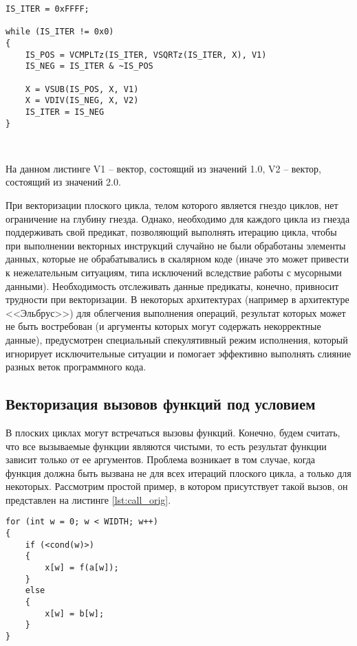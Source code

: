 \documentclass[
11pt,%
tightenlines,%
twoside,%
onecolumn,%
nofloats,%
nobibnotes,%
nofootinbib,%
superscriptaddress,%
noshowpacs,%
centertags]%
{revtex4}
\begin{document}
\begin{lstlisting}[caption={Векторная форма плоского цикла, содержащего цикл с неконстантным числом итераций},label={lst:while_loop_vec}]
IS_ITER = 0xFFFF;

while (IS_ITER != 0x0)
{
    IS_POS = VCMPLTz(IS_ITER, VSQRTz(IS_ITER, X), V1)
    IS_NEG = IS_ITER & ~IS_POS
    
    X = VSUB(IS_POS, X, V1)
    X = VDIV(IS_NEG, X, V2)
    IS_ITER = IS_NEG
}
\end{lstlisting}

\

На данном листинге V1 -- вектор, состоящий из значений 1.0, V2 -- вектор, состоящий из значений 2.0.

При векторизации плоского цикла, телом которого является гнездо циклов, нет ограничение на глубину гнезда.
Однако, необходимо для каждого цикла из гнезда поддерживать свой предикат, позволяющий выполнять итерацию цикла, чтобы при выполнении векторных инструкций случайно не были обработаны элементы данных, которые не обрабатывались в скалярном коде (иначе это может привести к нежелательным ситуациям, типа исключений вследствие работы с мусорными данными).
Необходимость отслеживать данные предикаты, конечно, привносит трудности при векторизации.
В некоторых архитектурах (например в архитектуре <<Эльбрус>>) для облегчения выполнения операций, результат которых может не быть востребован (и аргументы которых могут содержать некорректные данные), предусмотрен специальный спекулятивный режим исполнения, который игнорирует исключительные ситуации и помогает эффективно выполнять слияние разных веток программного кода.

\subsection{Векторизация вызовов функций под условием}

В плоских циклах могут встречаться вызовы функций.
Конечно, будем считать, что все вызываемые функции являются чистыми, то есть результат функции зависит только от ее аргументов.
Проблема возникает в том случае, когда функция должна быть вызвана не для всех итераций плоского цикла, а только для некоторых.
Рассмотрим простой пример, в котором присутствует такой вызов, он представлен на листинге \ref{lst:call_orig}.

\begin{lstlisting}[caption={Пример плоского цикла с вызовом функции под условием},label={lst:call_orig}]
for (int w = 0; w < WIDTH; w++)
{
    if (<cond(w)>)
    {
        x[w] = f(a[w]);
    }
    else
    {
        x[w] = b[w];
    }
}
\end{lstlisting}
\end{document}
